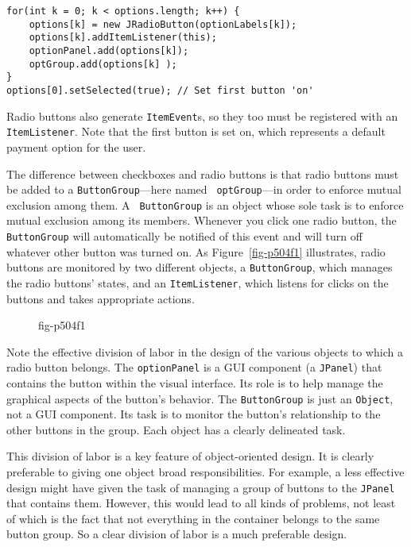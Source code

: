 \begin{jjjlisting}
\begin{lstlisting}
for(int k = 0; k < options.length; k++) {
    options[k] = new JRadioButton(optionLabels[k]);
    options[k].addItemListener(this);
    optionPanel.add(options[k]);
    optGroup.add(options[k] );
}
options[0].setSelected(true); // Set first button 'on'
\end{lstlisting}
\end{jjjlisting}
\noindent Radio buttons also generate {\tt ItemEvent}s, so they too
must be registered with an {\tt ItemListener}. Note that the
first button is set on, which represents a default payment
option for the user.

The difference between checkboxes and radio buttons is that radio
buttons must be added to a {\tt ButtonGroup}---here named {\tt
optGroup}---in order to enforce mutual exclusion among them.  A {\tt
ButtonGroup} is an object whose sole task is to enforce mutual
exclusion among its members. Whenever you click one radio button, the
{\tt ButtonGroup} will automatically be notified of this event and
will turn off whatever other button was turned on.  As
Figure~\ref{fig-p504f1} illustrates, radio buttons are monitored by
two different objects, a {\tt ButtonGroup}, which manages the radio
buttons' states, and an {\tt ItemListener}, which listens for clicks
on the buttons and takes appropriate actions.

\begin{figure}[h!]
{fig-p504f1}

\end{figure}

Note the effective division of labor in the design of
the various objects to which a radio button belongs. The
{\tt optionPanel} is a GUI component (a {\tt JPanel}) that contains the
button within the visual interface. Its role is to help manage the
graphical aspects of the button's behavior.  The {\tt ButtonGroup} is
just an {\tt Object}, not a GUI component. Its task is to monitor the
button's relationship to the other buttons in the group.  Each object
has a clearly delineated task.

This division of labor is a key feature of object-oriented design. It
is clearly preferable to giving one object broad responsibilities.
For example, a less effective design might have given the task of
managing a group of buttons to the {\tt JPanel} that contains them.
However, this would lead to all kinds of problems, not least of which
is the fact that not everything in the container belongs to the same
button group. So a clear division of labor is a much preferable
design.

